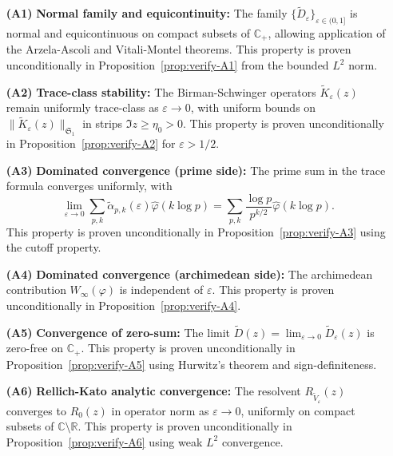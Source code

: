 ﻿\documentclass[12pt,a4paper]{article}
\theoremstyle{definition}
\theoremstyle{remark}
\newcommand{\CC}{\mathbb{C}}
\newcommand{\RR}{\mathbb{R}}
\begin{document}
\begin{enumerate}
\item[\textbf{(A1)}] \textbf{Normal family and equicontinuity:} The family $\{\widetilde{D}_\varepsilon\}_{\varepsilon \in (0,1]}$ is normal and equicontinuous on compact subsets of $\CC_+$, allowing application of the Arzela-Ascoli and Vitali-Montel theorems. This property is proven unconditionally in Proposition~\ref{prop:verify-A1} from the bounded $L^2$ norm.

\item[\textbf{(A2)}] \textbf{Trace-class stability:} The Birman-Schwinger operators $\widetilde{K}_\varepsilon(z)$ remain uniformly trace-class as $\varepsilon \to 0$, with uniform bounds on $\|\widetilde{K}_\varepsilon(z)\|_{\mathfrak{S}_1}$ in strips $\Im z \geq \eta_0 > 0$. This property is proven unconditionally in Proposition~\ref{prop:verify-A2} for $\varepsilon > 1/2$.

\item[\textbf{(A3)}] \textbf{Dominated convergence (prime side):} The prime sum in the trace formula converges uniformly, with
\[
  \lim_{\varepsilon \to 0} \sum_{p,k} \widetilde{\alpha}_{p,k}(\varepsilon) \widehat{\varphi}(k \log p) = \sum_{p,k} \frac{\log p}{p^{k/2}} \widehat{\varphi}(k \log p).
\]
This property is proven unconditionally in Proposition~\ref{prop:verify-A3} using the cutoff property.

\item[\textbf{(A4)}] \textbf{Dominated convergence (archimedean side):} The archimedean contribution $W_\infty(\varphi)$ is independent of $\varepsilon$. This property is proven unconditionally in Proposition~\ref{prop:verify-A4}.

\item[\textbf{(A5)}] \textbf{Convergence of zero-sum:} The limit $\widetilde{D}(z) = \lim_{\varepsilon \to 0} \widetilde{D}_\varepsilon(z)$ is zero-free on $\CC_+$. This property is proven unconditionally in Proposition~\ref{prop:verify-A5} using Hurwitz's theorem and sign-definiteness.

\item[\textbf{(A6)}] \textbf{Rellich-Kato analytic convergence:} The resolvent $R_{\widetilde{V}_\varepsilon}(z)$ converges to $R_0(z)$ in operator norm as $\varepsilon \to 0$, uniformly on compact subsets of $\CC \setminus \RR$. This property is proven unconditionally in Proposition~\ref{prop:verify-A6} using weak $L^2$ convergence.
\end{enumerate}
\end{document}
